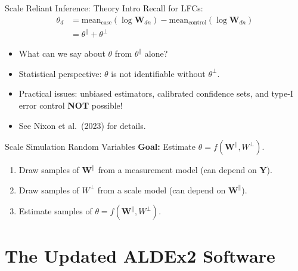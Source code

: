 \documentclass[
  ignorenonframetext,
]{beamer}
\begin{document}
\begin{frame}{Scale Reliant Inference: Theory Intro}
\protect\hypertarget{scale-reliant-inference-theory-intro-1}{}
Recall for LFCs: \begin{align*}
\theta_d &= \text{mean}_{\text{case}}(\log \mathbf{W}_{dn} ) - \text{mean}_{\text{control}}(\log \mathbf{W}_{dn} )\\
&= \theta^\parallel + \theta^\perp
\end{align*}

\begin{itemize}
\item
  What can we say about \(\theta\) from \(\theta^\parallel\) alone?
\item
  Statistical perspective: \(\theta\) is not identifiable without
  \(\theta^\perp\).
\item
  Practical issues: unbiased estimators, calibrated confidence sets, and
  type-I error control \textbf{NOT} possible!
\item
  See Nixon et al.~(2023) for details.
\end{itemize}
\end{frame}

\begin{frame}{Scale Simulation Random Variables}
\protect\hypertarget{scale-simulation-random-variables}{}
\textbf{Goal:} Estimate \(\theta = f(\mathbf{W}^\parallel, W^\perp)\).

\vspace{.25in}

\begin{enumerate}
\item
  Draw samples of \(\mathbf{W}^{\parallel}\) from a measurement model
  (can depend on \(\mathbf{Y}\)).
\item
  Draw samples of \(W^{\perp}\) from a scale model (can depend on
  \(\mathbf{W}^{\parallel}\)).
\item
  Estimate samples of \(\theta = f(\mathbf{W}^\parallel, W^\perp)\).
\end{enumerate}
\end{frame}

\hypertarget{the-updated-aldex2-software}{%
\section{The Updated ALDEx2
Software}\label{the-updated-aldex2-software}}
\end{document}
